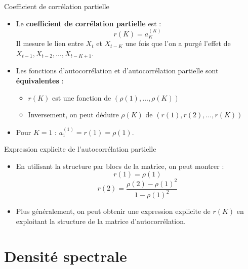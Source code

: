 \documentclass[11pt,aspectratio=169]{beamer}
\begin{document}
\begin{frame}{Coefficient de corrélation partielle}

\begin{itemize}

\item Le \textbf{coefficient de corrélation partielle} est :
  \[
  r(K) = a_K^{(K)}
  \]
  Il mesure le lien entre $X_t$ et $X_{t-K}$ une fois que l'on a purgé l'effet de $X_{t-1}, X_{t-2}, \ldots, X_{t-K+1}$.\newline

\item Les fonctions d'autocorrélation et d'autocorrélation partielle sont \textbf{équivalentes} :
  \begin{itemize}
    \item $r(K)$ est une fonction de $(\rho(1), \ldots, \rho(K))$\newline
    \item Inversement, on peut déduire $\rho(K)$ de $(r(1), r(2), \ldots, r(K))$
  \end{itemize}

\item Pour $K = 1$ : $a_1^{(1)} = r(1) = \rho(1)$.

\end{itemize}

\end{frame}

\begin{frame}{Expression explicite de l'autocorrélation partielle}

\begin{itemize}

\item En utilisant la structure par blocs de la matrice, on peut montrer :
  \[
  r(1) = \rho(1)
  \]
  \[
  r(2) = \frac{\rho(2) - \rho(1)^2}{1 - \rho(1)^2}
  \]\newline

\item Plus généralement, on peut obtenir une expression explicite de $r(K)$ en exploitant la structure de la matrice d'autocorrélation.

\end{itemize}

\end{frame}

\section{Densité spectrale}
\end{document}
